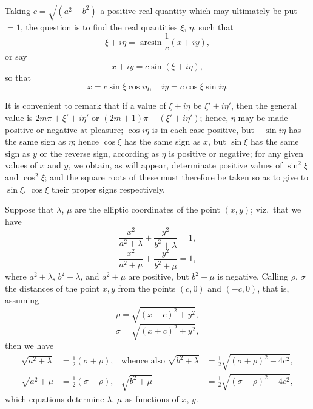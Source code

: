 \documentclass[11pt,a4paper]{article}
\begin{document}
\medskip

Taking $c = \sqrt{(a^{2} - b^{2})}$ a positive real quantity which may ultimately be put $= 1$, the question is to find the real quantities $\xi$, $\eta$, such that
\[
\xi + i\eta = \arcsin\frac{1}{c}(x + iy),
\]
or say
\[
x + iy = c\sin(\xi + i\eta),
\]
so that
\[
x = c\sin\xi\cos i\eta,\quad iy = c\cos\xi\sin i\eta.
\]

\medskip

It is convenient to remark that if a value of $\xi + i\eta$ be $\xi' + i\eta'$, then the general value is $2m\pi + \xi' + i\eta'$ or $(2m + 1)\pi - (\xi' + i\eta')$; hence, $\eta$ may be made positive or negative at pleasure; $\cos i\eta$ is in each case positive, but $-\sin i\eta$ has the same sign as $\eta$; hence $\cos\xi$ has the same sign as $x$, but $\sin\xi$ has the same sign as $y$ or the reverse sign, according as $\eta$ is positive or negative; for any given values of $x$ and $y$, we obtain, as will appear, determinate positive values of $\sin^{2}\xi$ and $\cos^{2}\xi$; and the square roots of these must therefore be taken so as to give to $\sin\xi$, $\cos\xi$ their proper signs respectively.

\newpage


Suppose that $\lambda$, $\mu$ are the elliptic coordinates of the point $(x, y)$; viz.\ that we have
\[
\frac{x^{2}}{a^{2} + \lambda} + \frac{y^{2}}{b^{2} + \lambda} = 1,
\]
\[
\frac{x^{2}}{a^{2} + \mu} + \frac{y^{2}}{b^{2} + \mu} = 1,
\]
where $a^{2} + \lambda$, $b^{2} + \lambda$, and $a^{2} + \mu$ are positive, but $b^{2} + \mu$ is negative. Calling $\rho$, $\sigma$ the distances of the point $x, y$ from the points $(c, 0)$ and $(-c, 0)$, that is, assuming
\[
\rho = \sqrt{(x - c)^{2} + y^{2}},
\]
\[
\sigma = \sqrt{(x + c)^{2} + y^{2}},
\]
then we have
\begin{align*}
\sqrt{a^{2} + \lambda} &= \tfrac{1}{2}(\sigma + \rho), &\text{whence also } \sqrt{b^{2} + \lambda} &= \tfrac{1}{2}\sqrt{(\sigma + \rho)^{2} - 4c^{2}},\\
\sqrt{a^{2} + \mu} &= \tfrac{1}{2}(\sigma - \rho), &\sqrt{b^{2} + \mu} &= \tfrac{1}{2}\sqrt{(\sigma - \rho)^{2} - 4c^{2}},
\end{align*}
which equations determine $\lambda$, $\mu$ as functions of $x$, $y$.

\medskip
\end{document}
